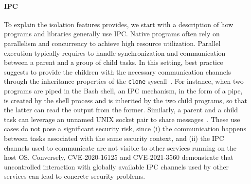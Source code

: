\paragraph{IPC}
To explain the isolation features \pap provides, we start with a
description of how programs and libraries generally use IPC.
Native programs often rely on parallelism and concurrency to achieve
high resource utilization. Parallel execution typically requires to
handle synchronization and communication between a parent and a group
of child tasks. In this setting, best practice suggests to provide the
children with the necessary communication channels through the
inheritance properties of the {\tt clone} syscall~\cite{doc-pipe}. For
instance, when two programs are piped in the Bash shell, an IPC
mechanism, in the form of a pipe, is created by the shell process and
is inherited by the two child programs, so that the latter can read
the output from the former. Similarly, a parent and a child task can
leverage an unnamed UNIX socket pair to share
messages~\cite{doc-socketpair}. These use cases do not pose a
significant security risk, since (i) the communication happens between
tasks associated with the same security context, and (ii) the IPC
channels used to communicate are not visible to other services running
on the host OS. Conversely, CVE-2020-16125 and CVE-2021-3560
demonstrate that uncontrolled interaction with globally available IPC
channels used by other services can lead to concrete security
problems.

